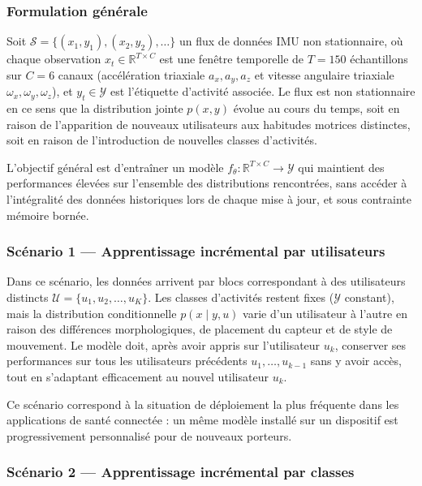 \documentclass[a4paper,12pt]{report}
\begin{document}
\subsubsection{Formulation générale}

Soit $\mathcal{S} = \{(x_1, y_1), (x_2, y_2), \ldots\}$ un flux de données IMU non stationnaire, où chaque observation $x_t \in \mathbb{R}^{T \times C}$ est une fenêtre temporelle de $T = 150$ échantillons sur $C = 6$ canaux (accélération triaxiale $a_x, a_y, a_z$ et vitesse angulaire triaxiale $\omega_x, \omega_y, \omega_z$), et $y_t \in \mathcal{Y}$ est l'étiquette d'activité associée. Le flux est non stationnaire en ce sens que la distribution jointe $p(x, y)$ évolue au cours du temps, soit en raison de l'apparition de nouveaux utilisateurs aux habitudes motrices distinctes, soit en raison de l'introduction de nouvelles classes d'activités.

L'objectif général est d'entraîner un modèle $f_\theta : \mathbb{R}^{T \times C} \to \mathcal{Y}$ qui maintient des performances élevées sur l'ensemble des distributions rencontrées, sans accéder à l'intégralité des données historiques lors de chaque mise à jour, et sous contrainte mémoire bornée.

\subsubsection{Scénario 1 — Apprentissage incrémental par utilisateurs}

Dans ce scénario, les données arrivent par blocs correspondant à des utilisateurs distincts $\mathcal{U} = \{u_1, u_2, \ldots, u_K\}$. Les classes d'activités restent fixes ($\mathcal{Y}$ constant), mais la distribution conditionnelle $p(x \mid y, u)$ varie d'un utilisateur à l'autre en raison des différences morphologiques, de placement du capteur et de style de mouvement. Le modèle doit, après avoir appris sur l'utilisateur $u_k$, conserver ses performances sur tous les utilisateurs précédents $u_1, \ldots, u_{k-1}$ sans y avoir accès, tout en s'adaptant efficacement au nouvel utilisateur $u_k$.

Ce scénario correspond à la situation de déploiement la plus fréquente dans les applications de santé connectée : un même modèle installé sur un dispositif est progressivement personnalisé pour de nouveaux porteurs.

\subsubsection{Scénario 2 — Apprentissage incrémental par classes}
\end{document}
